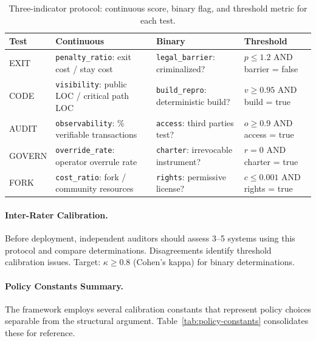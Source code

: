 \documentclass{article}
\begin{document}
\begin{table}[htbp]
\centering
\scriptsize
\caption{Three-indicator protocol: continuous score, binary flag, and threshold metric for each test.}
\label{tab:three-indicator-main}
\begin{tabular}{@{}lp{2.8cm}p{2.8cm}p{3.2cm}@{}}
\toprule
\textbf{Test} & \textbf{Continuous} & \textbf{Binary} & \textbf{Threshold} \\
\midrule
EXIT & \texttt{penalty\_ratio}: exit cost / stay cost & \texttt{legal\_barrier}: criminalized? & $p \leq 1.2$ AND barrier = false \\
CODE & \texttt{visibility}: public LOC / critical path LOC & \texttt{build\_repro}: deterministic build? & $v \geq 0.95$ AND build = true \\
AUDIT & \texttt{observability}: \% verifiable transactions & \texttt{access}: third parties test? & $o \geq 0.9$ AND access = true \\
GOVERN & \texttt{override\_rate}: operator overrule rate & \texttt{charter}: irrevocable instrument? & $r = 0$ AND charter = true \\
FORK & \texttt{cost\_ratio}: fork / community resources & \texttt{rights}: permissive license? & $c \leq 0.001$ AND rights = true \\
\bottomrule
\end{tabular}
\end{table}

\paragraph{Inter-Rater Calibration.} Before deployment, independent auditors should assess 3--5 systems using this protocol and compare determinations. Disagreements identify threshold calibration issues. Target: $\kappa \geq 0.8$ (Cohen's kappa) for binary determinations.

\paragraph{Policy Constants Summary.} The framework employs several calibration constants that represent policy choices separable from the structural argument. Table~\ref{tab:policy-constants} consolidates these for reference.
\end{document}
